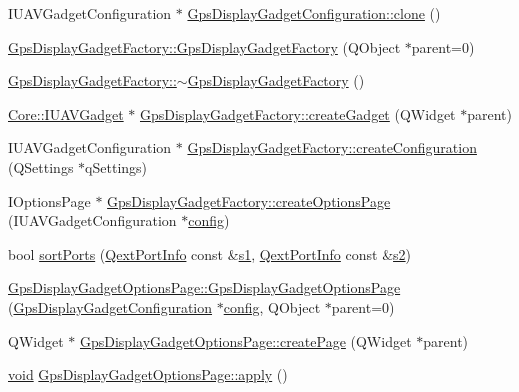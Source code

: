 \begin{DoxyCompactItemize}
\item 
I\-U\-A\-V\-Gadget\-Configuration $\ast$ \hyperlink{group___g_p_s_gadget_plugin_ga547748a8ac6a8901cbf20143b3bd9a5d}{Gps\-Display\-Gadget\-Configuration\-::clone} ()
\item 
\hyperlink{group___g_p_s_gadget_plugin_ga5c7c8cda8cf65d39d9ae165194901eee}{Gps\-Display\-Gadget\-Factory\-::\-Gps\-Display\-Gadget\-Factory} (Q\-Object $\ast$parent=0)
\item 
\hyperlink{group___g_p_s_gadget_plugin_ga82537537ded6a09ef83bb5b8480dc521}{Gps\-Display\-Gadget\-Factory\-::$\sim$\-Gps\-Display\-Gadget\-Factory} ()
\item 
\hyperlink{class_core_1_1_i_u_a_v_gadget}{Core\-::\-I\-U\-A\-V\-Gadget} $\ast$ \hyperlink{group___g_p_s_gadget_plugin_gabda9dce6df1e2608e4450ae1573588df}{Gps\-Display\-Gadget\-Factory\-::create\-Gadget} (Q\-Widget $\ast$parent)
\item 
I\-U\-A\-V\-Gadget\-Configuration $\ast$ \hyperlink{group___g_p_s_gadget_plugin_gae66522a3ebff0d0efac6e71ddf729657}{Gps\-Display\-Gadget\-Factory\-::create\-Configuration} (Q\-Settings $\ast$q\-Settings)
\item 
I\-Options\-Page $\ast$ \hyperlink{group___g_p_s_gadget_plugin_gab72aeb74597d8373b64dce43943c9e75}{Gps\-Display\-Gadget\-Factory\-::create\-Options\-Page} (I\-U\-A\-V\-Gadget\-Configuration $\ast$\hyperlink{deflate_8c_a4473b5227787415097004fd39f55185e}{config})
\item 
bool \hyperlink{group___g_p_s_gadget_plugin_ga6244f67dce3641a662a3c15f4eba081b}{sort\-Ports} (\hyperlink{struct_qext_port_info}{Qext\-Port\-Info} const \&\hyperlink{_o_p_plots_8m_a2f07e0f444810cc4e54ee2be2ce0ac65}{s1}, \hyperlink{struct_qext_port_info}{Qext\-Port\-Info} const \&\hyperlink{_o_p_plots_8m_a2e63e71737e8b6802b81f6a7c5ca6a0a}{s2})
\item 
\hyperlink{group___g_p_s_gadget_plugin_ga2cc5111e9489419740cbbfb61043fcd3}{Gps\-Display\-Gadget\-Options\-Page\-::\-Gps\-Display\-Gadget\-Options\-Page} (\hyperlink{class_gps_display_gadget_configuration}{Gps\-Display\-Gadget\-Configuration} $\ast$\hyperlink{deflate_8c_a4473b5227787415097004fd39f55185e}{config}, Q\-Object $\ast$parent=0)
\item 
Q\-Widget $\ast$ \hyperlink{group___g_p_s_gadget_plugin_gac8c534a784eaab5341c1baf07c5dec0b}{Gps\-Display\-Gadget\-Options\-Page\-::create\-Page} (Q\-Widget $\ast$parent)
\item 
\hyperlink{group___u_a_v_objects_plugin_ga444cf2ff3f0ecbe028adce838d373f5c}{void} \hyperlink{group___g_p_s_gadget_plugin_gae80bdcce5ad91f0ada2fcf74ee83242a}{Gps\-Display\-Gadget\-Options\-Page\-::apply} ()

\end{DoxyCompactItemize}
